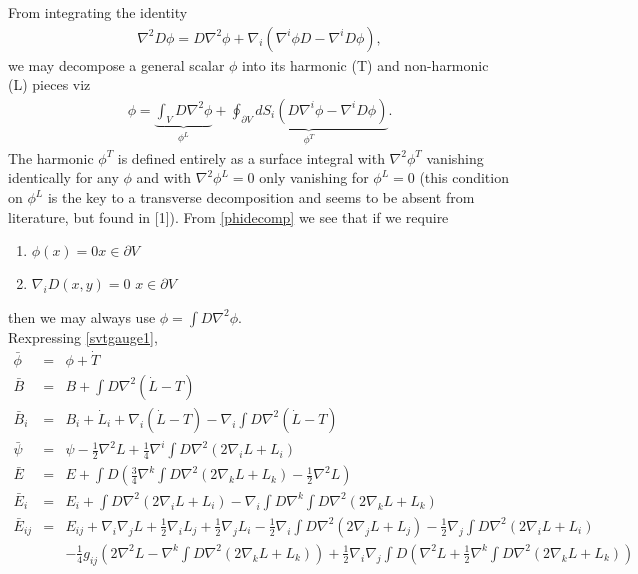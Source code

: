 \documentclass[10pt,letterpaper]{article}
\numberwithin{equation}{section}
\begin{document}
From integrating the identity
\begin{eqnarray}
\nabla^2 D \phi = D\nabla^2 \phi + \nabla_i \left( \nabla^i \phi D - \nabla^i D \phi\right),
\end{eqnarray}
we may decompose a general scalar $\phi$ into its harmonic (T) and non-harmonic (L) pieces viz
\begin{eqnarray}
\phi =\underbrace{\int_V D \nabla^2 \phi}_{\phi^L} + \underbrace{\oint_{\partial V} dS_i \left( D \nabla^i \phi - \nabla^i D \phi\right)}_{\phi^T}.
\label{phidecomp}
\end{eqnarray}
The harmonic $\phi^T$ is defined entirely as a surface integral with $\nabla^2 \phi^T$ vanishing identically for any $\phi$ and with $\nabla^2 \phi^L=0$ only vanishing for $\phi^L=0$ (this condition on $\phi^L$ is the key to a transverse decomposition and seems to be absent from literature, but found in [1]). 
From \eqref{phidecomp} we see that if we require
\begin{enumerate}
	\item $\phi(x) =0 $\quad{}\quad $x\in \partial V$
	\item $\nabla_i D(x,y)= 0$ \quad{}\quad $x\in \partial V$
\end{enumerate}
then we may always use $\phi = \int D\nabla^2 \phi$. 
\\ 
Rexpressing \eqref{svtgauge1},
\begin{eqnarray}
\bar\phi &=& \phi+ \dot T
\nonumber\\
\bar B &=& B + \int D \nabla^2(\dot L-T)
\nonumber\\
\bar B_i &=& B_i + \dot L_i + \nabla_i (\dot L-T) - \nabla_i \int D \nabla^2(\dot L-T)
\nonumber\\
\bar\psi&=& \psi -\tfrac12 \nabla^2 L+\tfrac14 \nabla^i \int D \nabla^2 (2\nabla_i L + L_i)
\nonumber\\
\bar E&=& E + \int D\left(\tfrac34 \nabla^k \int D\nabla^2(2\nabla_k L + L_k) -\tfrac12 \nabla^2 L\right)
\nonumber\\
\bar E_i &=& E_i + \int D\nabla^2 (2 \nabla_i L + L_i) - \nabla_i \int D \nabla^k \int D\nabla^2 (2 \nabla_k L + L_k)
\nonumber\\
\bar E_{ij} &=& E_{ij} +\nabla_i \nabla_j L + \tfrac12\nabla_i L_j+ \tfrac12\nabla_j L_i
-\tfrac12\nabla_i \int D\nabla^2 (2\nabla_j L + L_j) - \tfrac12\nabla_j \int D \nabla^2 (2\nabla_i L + L_i)
\nonumber\\
&&-\tfrac14 g_{ij}\left( 2 \nabla^2 L - \nabla^k \int D \nabla^2( 2\nabla_k L + L_k)\right)
 + \tfrac12 \nabla_i \nabla_j \int D \left( \nabla^2 L +\tfrac12 \nabla^k \int D \nabla^2 (2\nabla_k L +L_k)\right)
\nonumber\\
\label{svtgauge2}
\end{eqnarray}
\end{document}
